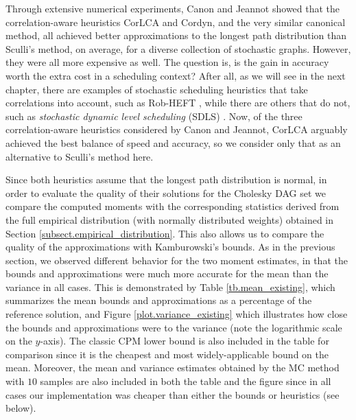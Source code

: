 \documentclass[12pt]{article}
\begin{document}
Through extensive numerical experiments, Canon and Jeannot showed that the correlation-aware heuristics CorLCA and Cordyn, and the very similar canonical method, all achieved better approximations to the longest path distribution than Sculli's method, on average, for a diverse collection of stochastic graphs. However, they were all more expensive as well. The question is, is the gain in accuracy worth the extra cost in a scheduling context? After all, as we will see in the next chapter, there are examples of stochastic scheduling heuristics that take correlations into account, such as Rob-HEFT \cite{can10}, while there are others that do not, such as {\em stochastic dynamic level scheduling} (SDLS) \cite{li15}. Now, of the three correlation-aware heuristics considered by Canon and Jeannot, CorLCA arguably achieved the best balance of speed and accuracy, so we consider only that as an alternative to Sculli's method here.

Since both heuristics assume that the longest path distribution is normal, in order to evaluate the quality of their solutions for the Cholesky DAG set we compare the computed moments with the corresponding statistics derived from the full empirical distribution (with normally distributed weights) obtained in Section \ref{subsect.empirical_distribution}. This also allows us to compare the quality of the approximations with Kamburowski's bounds. As in the previous section, we observed different behavior for the two moment estimates, in that the bounds and approximations were much more accurate for the mean than the variance in all cases. This is demonstrated by Table \ref{tb.mean_existing}, which summarizes the mean bounds and approximations as a percentage of the reference solution, and Figure \ref{plot.variance_existing} which illustrates how close the bounds and approximations were to the variance (note the logarithmic scale on the $y$-axis). The classic CPM lower bound is also included in the table for comparison since it is the cheapest and most widely-applicable bound on the mean. Moreover, the mean and variance estimates obtained by the MC method with $10$ samples are also included in both the table and the figure since in all cases our implementation was cheaper than either the bounds or heuristics (see below). 
\end{document}
